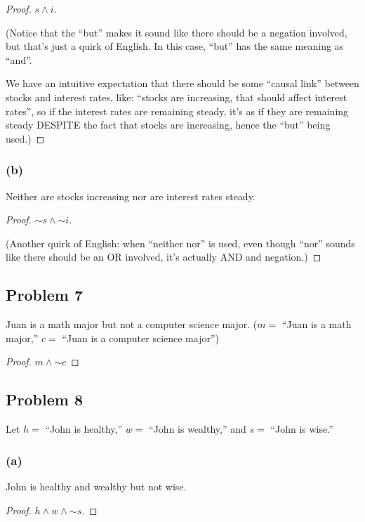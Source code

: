 \documentclass[14pt]{extarticle}
\begin{document}
\begin{proof}
$s \wedge i$.

(Notice that the ``but'' makes it sound like there should be a
negation involved, but that's just a quirk of English. In this case, ``but'' has the same meaning as ``and''.

We have an intuitive expectation that there should be some ``causal link'' between stocks and interest rates, like: ``stocks are increasing, that should affect interest rates'', so if the interest rates are remaining steady, it's as if they are remaining steady DESPITE the fact that stocks are increasing, hence the ``but'' being used.)
\end{proof}

\subsubsection{(b)}
Neither are stocks increasing nor are interest rates steady.

\begin{proof}
${\sim s} \wedge {\sim i}$.

(Another quirk of English: when ``neither nor'' is used, even though ``nor'' sounds like there should be an OR involved, it's actually AND and negation.)
\end{proof}

\subsection{Problem 7}
Juan is a math major but not a computer science major. ($m =$ “Juan is a math major,” $c =$ “Juan is a computer science major”)

\begin{proof}
$m \wedge {\sim c}$
\end{proof}

\subsection{Problem 8}
Let $h =$ “John is healthy,” $w =$ “John is wealthy,” and
$s =$ “John is wise.”

\subsubsection{(a)}
John is healthy and wealthy but not wise.

\begin{proof}
$h \wedge w \wedge {\sim s}$.
\end{proof}
\end{document}
